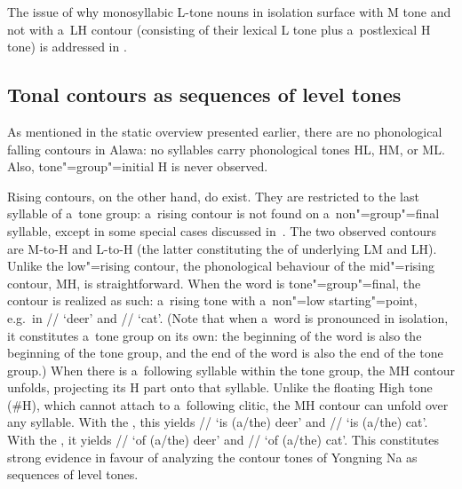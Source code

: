 The issue of why monosyllabic L-tone nouns in isolation surface with M tone and not with a~LH contour (consisting of their lexical L tone plus a~postlexical H tone) is addressed in .


\subsection{Tonal contours as sequences of level tones}
\label{sec:contourtonessequencesofleveltonesonthesamesyllable}

As mentioned in the static overview presented earlier, there are no phonological falling contours in
Alawa: no syllables carry phonological tones HL, HM, or ML. Also, tone"=group"=initial H is
never observed.

Rising contours, on the other hand, do exist. They are restricted to the last syllable of a~tone
group: a~rising contour is not found on a~non"=group"=final syllable, except in some special cases
discussed in~. The two observed contours are M-to-H and L-to-H (the latter
constituting the  of underlying LM and LH). Unlike the
low"=rising contour, the phonological behaviour of the mid"=rising contour, MH, is straightforward. When the word
is tone"=group"=final, the contour is realized as such: a~rising tone with a~non"=low starting"=point,
e.g.~in // ‘deer’ and // ‘cat’. (Note that when a~word is pronounced in
isolation, it constitutes a~{tone group} on its own: the beginning of the word is also the beginning
of the {tone group}, and the end of the word is also the end of the {tone group}.)  When there is
a~following syllable within the {tone group}, the MH contour unfolds, projecting its H part onto that
syllable. Unlike the floating High tone (\#H), which cannot attach to a~following clitic, the MH
contour can unfold over any syllable. With the , this yields // ‘is \mbox{(a/the)}
deer’ and // ‘is \mbox{(a/the)} cat’. With the , it yields // ‘of
(a/the) deer’ and // ‘of \mbox{(a/the)} cat’. This constitutes strong evidence in favour of analyzing the contour tones of Yongning Na as sequences of level tones. 

